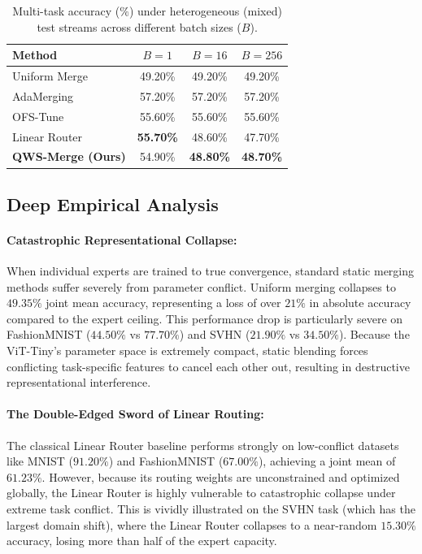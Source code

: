 \begin{table}[h]
\caption{Multi-task accuracy ($\%$) under heterogeneous (mixed) test streams across different batch sizes ($B$).}
\label{tab:hetero_results}
\vskip 0.15in
\begin{center}
\begin{small}
\begin{sc}
\begin{tabular}{lccc}
\toprule
Method & $B=1$ & $B=16$ & $B=256$ \\
\midrule
Uniform Merge & 49.20\% & 49.20\% & 49.20\% \\
AdaMerging    & 57.20\% & 57.20\% & 57.20\% \\
OFS-Tune      & 55.60\% & 55.60\% & 55.60\% \\
\midrule
Linear Router & \textbf{55.70\%} & 48.60\% & 47.70\% \\
\textbf{QWS-Merge (Ours)} & 54.90\% & \textbf{48.80\%} & \textbf{48.70\%} \\
\bottomrule
\end{tabular}
\end{sc}
\end{small}
\end{center}
\vskip -0.1in
\end{table}

\subsection{Deep Empirical Analysis}
\label{subsec:analysis}

\paragraph{Catastrophic Representational Collapse:}
When individual experts are trained to true convergence, standard static merging methods suffer severely from parameter conflict. Uniform merging collapses to $49.35\%$ joint mean accuracy, representing a loss of over $21\%$ in absolute accuracy compared to the expert ceiling. This performance drop is particularly severe on FashionMNIST ($44.50\%$ vs $77.70\%$) and SVHN ($21.90\%$ vs $34.50\%$). Because the ViT-Tiny's parameter space is extremely compact, static blending forces conflicting task-specific features to cancel each other out, resulting in destructive representational interference.

\paragraph{The Double-Edged Sword of Linear Routing:}
The classical Linear Router baseline performs strongly on low-conflict datasets like MNIST ($91.20\%$) and FashionMNIST ($67.00\%$), achieving a joint mean of $61.23\%$. However, because its routing weights are unconstrained and optimized globally, the Linear Router is highly vulnerable to catastrophic collapse under extreme task conflict. This is vividly illustrated on the SVHN task (which has the largest domain shift), where the Linear Router collapses to a near-random $15.30\%$ accuracy, losing more than half of the expert capacity.

